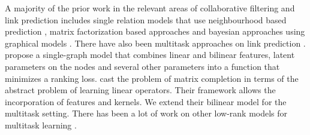 \documentclass[runningheads,a4paper]{llncs}
\begin{document}
A majority of the prior work in the relevant areas of collaborative filtering and link prediction includes single relation models that use neighbourhood based prediction \citep{sarwar01}, matrix factorization based approaches \citep{koren09,menon_ecml11} and bayesian approaches using graphical models \citep{jin02,phung09}. 
There have also been multitask approaches on link prediction \citep{zhang12,cao_icml2010,li09,cmf}. 
\cite{menon_ecml11} propose a single-graph model that combines linear 
and bilinear features, latent parameters on the nodes and several other parameters into a function that minimizes a ranking loss. 
\cite{abernethy} cast the problem of matrix completion in terms of the abstract problem of learning linear operators. Their framework allows the incorporation of features and kernels. We extend their bilinear model for the multitask setting. There has been a lot of work on other low-rank models for multitask learning \citep{ando2005,ji2009,chen2012,chen2013}. %

\end{document}
